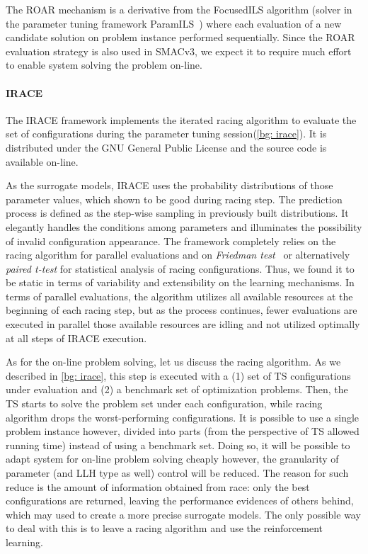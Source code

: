 The ROAR mechanism is a derivative from the FocusedILS algorithm (solver in the parameter tuning framework ParamILS~\cite{hutter2009paramils}) where each evaluation of a new candidate solution on problem instance performed sequentially. Since the ROAR evaluation strategy is also used in SMACv3, we expect it to require much effort to enable system solving the problem on-line.


\paragraph{IRACE}
The IRACE framework implements the iterated racing algorithm to evaluate the set of configurations during the parameter tuning session(\cref{bg: irace}). It is distributed under the GNU General Public License and the source code is available on-line.

As the surrogate models, IRACE uses the probability distributions of those parameter values, which shown to be good during racing step. The prediction process is defined as the step-wise sampling in previously built distributions. It elegantly handles the conditions among parameters and illuminates the possibility of invalid configuration appearance.
The framework completely relies on the racing algorithm for parallel evaluations and on \emph{Friedman test}~\cite{conover1980practical} or alternatively \emph{paired t-test} for statistical analysis of racing configurations. Thus, we found it to be static in terms of variability and extensibility on the learning mechanisms.
In terms of parallel evaluations, the algorithm utilizes all available resources at the beginning of each racing step, but as the process continues, fewer evaluations are executed in parallel those available resources are idling and not utilized optimally at all steps of IRACE execution.

As for the on-line problem solving, let us discuss the racing algorithm. As we described in \cref{bg: irace}, this step is executed with a (1) set of TS configurations under evaluation and (2) a benchmark set of optimization problems. Then, the TS starts to solve the problem set under each configuration, while racing algorithm drops the worst-performing configurations. It is possible to use a single problem instance however, divided into parts (from the perspective of TS allowed running time) instead of using a benchmark set. Doing so, it will be possible to adapt system for on-line problem solving cheaply however, the granularity of parameter (and LLH type as well) control will be reduced. The reason for such reduce is the amount of information obtained from race: only the best configurations are returned, leaving the performance evidences of others behind, which may used to create a more precise surrogate models. The only possible way to deal with this is to leave a racing algorithm and use the reinforcement learning.

